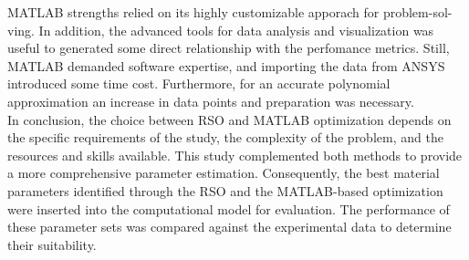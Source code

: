 MATLAB strengths relied on its highly customizable apporach for problem-sol-\\ving. 
In addition, the advanced tools for data 
analysis and visualization was useful to generated some direct relationship with the perfomance metrics. Still, 
MATLAB demanded software expertise, and importing the data from ANSYS introduced some time cost. Furthermore, for an 
accurate polynomial approximation an increase in data points and preparation was necessary.\\

In conclusion, the choice between RSO and MATLAB optimization depends on the specific requirements of the study, 
the complexity of the problem, and the resources and skills available. 
This study complemented both methods to provide a more comprehensive parameter estimation.
Consequently, the best material parameters identified through the RSO and the MATLAB-based optimization were 
inserted into the computational model for evaluation. The performance of these parameter sets was compared against 
the experimental data to determine their suitability.

%






